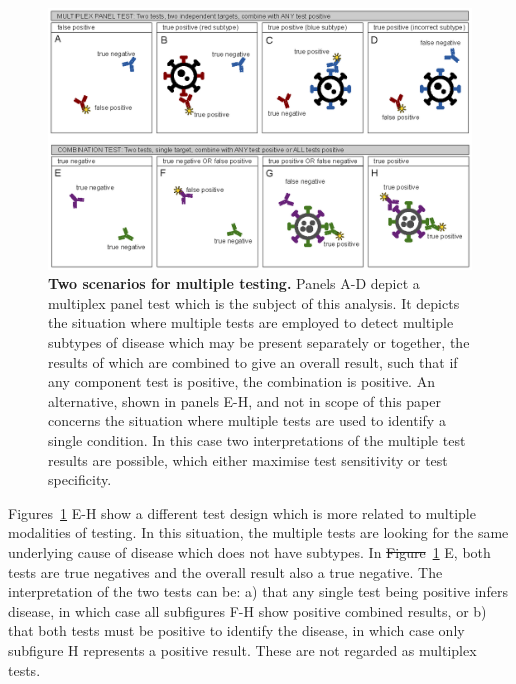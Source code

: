 \documentclass[10pt,letterpaper]{article}
\providecommand{\DIFaddtex}[1]{{\protect\color{blue}\uwave{#1}}} %
\providecommand{\DIFdeltex}[1]{{\protect\color{red}\sout{#1}}}                      %
\providecommand{\DIFaddbegin}{} %
\providecommand{\DIFaddend}{} %
\providecommand{\DIFdelbegin}{} %
\providecommand{\DIFdelend}{} %
\providecommand{\DIFaddbeginFL}{} %
\providecommand{\DIFaddendFL}{} %
\providecommand{\DIFdelendFL}{} %
\providecommand{\DIFadd}[1]{\texorpdfstring{\DIFaddtex{#1}}{#1}} %
\providecommand{\DIFdel}[1]{\texorpdfstring{\DIFdeltex{#1}}{}} %
\newcommand{\DIFscaledelfig}{0.5}
\newlength{\DIFdelgraphicswidth} %
\newlength{\DIFdelgraphicsheight} %
\newcommand{\DIFaddincludegraphics}[2][]{{\color{blue}\fbox{\DIFOincludegraphics[#1]{#2}}}} %
\newcommand{\DIFdelincludegraphics}[2][]{%
\sbox{\DIFdelgraphicsbox}{\DIFOincludegraphics[#1]{#2}}%
\settoboxwidth{\DIFdelgraphicswidth}{\DIFdelgraphicsbox} %
\settoboxtotalheight{\DIFdelgraphicsheight}{\DIFdelgraphicsbox} %
\scalebox{\DIFscaledelfig}{%
\parbox[b]{\DIFdelgraphicswidth}{\usebox{\DIFdelgraphicsbox}\\[-\baselineskip] \rule{\DIFdelgraphicswidth}{0em}}\llap{\resizebox{\DIFdelgraphicswidth}{\DIFdelgraphicsheight}{%
\setlength{\unitlength}{\DIFdelgraphicswidth}%
\begin{picture}(1,1)%
\thicklines\linethickness{2pt} %
{\color[rgb]{1,0,0}\put(0,0){\framebox(1,1){}}}%
{\color[rgb]{1,0,0}\put(0,0){\line( 1,1){1}}}%
{\color[rgb]{1,0,0}\put(0,1){\line(1,-1){1}}}%
\end{picture}%
}\hspace*{3pt}}} %
} %
\DeclareRobustCommand{\DIFaddbegin}{\DIFOaddbegin \let\includegraphics\DIFaddincludegraphics} %
\DeclareRobustCommand{\DIFaddend}{\DIFOaddend \let\includegraphics\DIFOincludegraphics} %
\DeclareRobustCommand{\DIFdelbegin}{\DIFOdelbegin \let\includegraphics\DIFdelincludegraphics} %
\DeclareRobustCommand{\DIFdelend}{\DIFOaddend \let\includegraphics\DIFOincludegraphics} %
\DeclareRobustCommand{\DIFaddbeginFL}{\DIFOaddbeginFL \let\includegraphics\DIFaddincludegraphics} %
\DeclareRobustCommand{\DIFaddendFL}{\DIFOaddendFL \let\includegraphics\DIFOincludegraphics} %
\DeclareRobustCommand{\DIFdelendFL}{\DIFOaddendFL \let\includegraphics\DIFOincludegraphics} %
\begin{document}
\DIFdelbegin %
\DIFdelendFL \DIFaddbeginFL \begin{figure}[!ht]
\DIFaddendFL \centerline{\includegraphics{fig/fig1-testerror-v2.eps}}
\caption{{\bf Two scenarios for multiple testing.}
Panels A-D depict a multiplex panel test which is the subject of this analysis. It depicts the situation where multiple tests are employed to detect multiple subtypes of disease which may be present separately or together, the results of which are combined to give an overall result, such that if any component test is positive, the combination is positive. An alternative, shown in panels E-H, and not in scope of this paper concerns the situation where multiple tests are used to identify a single condition. In this case two interpretations of the multiple test results are possible, which either maximise test sensitivity or test specificity.}
\label{fig1}
\end{figure}

Figures~\ref{fig1} E-H show a different test design which is more related to multiple modalities of testing\cite{weinstein2005}. In this situation, the multiple tests are looking for the same underlying cause of disease which does not have subtypes. In \DIFdelbegin \DIFdel{Figure}\DIFdelend \DIFaddbegin \DIFadd{Fig}\DIFaddend ~\ref{fig1} E, both tests are true negatives and the overall result also a true negative. The interpretation of the two tests can be: a) that any single test being positive infers disease, in which case all subfigures F-H show positive combined results, or b) that both tests must be positive to identify the disease, in which case only subfigure H represents a positive result. These are not regarded as multiplex tests.
\end{document}

